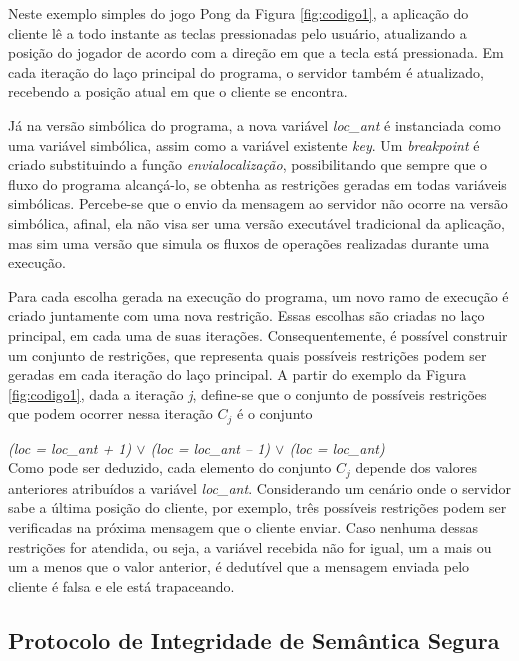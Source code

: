 Neste exemplo simples do jogo Pong da Figura \ref{fig:codigo1}, a aplicação do cliente lê a todo instante as teclas pressionadas pelo usuário, atualizando a posição do jogador de acordo com a direção em que a tecla está pressionada. Em cada iteração do laço principal do programa, o servidor também é atualizado, recebendo a posição atual em que o cliente se encontra. 

Já na versão simbólica do programa, a nova variável \textit{loc\_ant} é instanciada como uma variável simbólica, assim como a variável existente \textit{key}. Um \textit{breakpoint} é criado substituindo a função \textit{envialocalização}, possibilitando que sempre que o fluxo do programa alcançá-lo, se obtenha as restrições geradas em todas variáveis simbólicas. Percebe-se que o envio da mensagem ao servidor não ocorre na versão simbólica, afinal, ela não visa ser uma versão executável tradicional da aplicação, mas sim uma versão que simula os fluxos de operações realizadas durante uma execução.

Para cada escolha gerada na execução do programa, um novo ramo de execução é criado juntamente com uma nova restrição. Essas escolhas são criadas no laço principal, em cada uma de suas iterações. Consequentemente, é possível construir um conjunto de restrições, que representa quais possíveis restrições podem ser geradas em cada iteração do laço principal. 
A partir do exemplo da Figura \ref{fig:codigo1}, dada a iteração \textit{j}, define-se que o conjunto de possíveis restrições que podem ocorrer nessa iteração $C_j$ é o conjunto

\textit{(loc = loc\_ant + 1) $\vee$  (loc = loc\_ant -- 1) $\vee$ (loc = loc\_ant) } \\

Como pode ser deduzido, cada elemento do conjunto $C_j$ depende dos valores anteriores atribuídos a variável \textit{loc\_ant}. Considerando um cenário onde o servidor sabe a última posição do cliente, por exemplo, três possíveis restrições podem ser verificadas na próxima mensagem que o cliente enviar. Caso nenhuma dessas restrições for atendida, ou seja, a variável recebida não for igual, um a mais ou um a menos que o valor anterior, é dedutível que a mensagem enviada pelo cliente é falsa e ele está trapaceando.


\subsection{Protocolo de Integridade de Semântica Segura}
\label{semantics}

